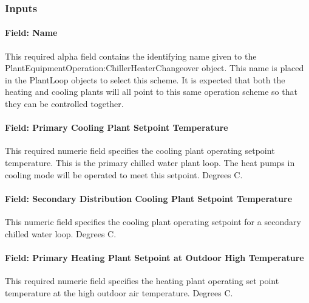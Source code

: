 \subsubsection{Inputs}\label{inputs-plantequipmentoperationchillerheaterchangeover}

\paragraph{Field: Name}\label{field-name-plantequipmentoperationchillerheaterchangeover}

This required alpha field contains the identifying name given to the PlantEquipmentOperation:ChillerHeaterChangeover object. This name is placed in the PlantLoop objects to select this scheme.  It is expected that both the heating and cooling plants will all point to this same operation scheme so that they can be controlled together. 

\paragraph{Field: Primary Cooling Plant Setpoint Temperature}\label{field-primary-chilled-water-temp-setpoint-plantequipmentoperationchillerheaterchangeover}

This required numeric field specifies the cooling plant operating setpoint temperature.  This is the primary chilled water plant loop.  The heat pumps in cooling mode will be operated to meet this setpoint. Degrees C.

\paragraph{Field: Secondary Distribution Cooling Plant Setpoint Temperature}\label{field-secondary-chilled-water-temp-setpoint-plantequipmentoperationchillerheaterchangeover}

This numeric field specifies the cooling plant operating setpoint for a secondary chilled water loop.  Degrees C. 

\paragraph{Field: Primary Heating Plant Setpoint at Outdoor High Temperature}\label{field-primary-hot-water-temp-setpoint-High-OA-plantequipmentoperationchillerheaterchangeover}

This required numeric field specifies the heating plant operating set point temperature at the high outdoor air temperature. Degrees C.

